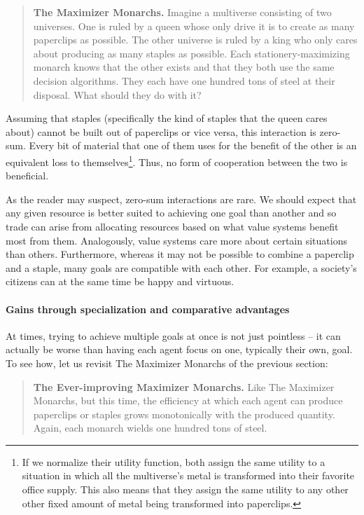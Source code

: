 \begin{quote}
\textbf{The Maximizer Monarchs.} Imagine a multiverse consisting of two
universes. One is ruled by a queen whose only drive it is to create as
many paperclips as possible. The other universe is ruled by a king who
only cares about producing as many staples as possible. Each
stationery-maximizing monarch knows that the other exists and that they
both use the same decision algorithms. They each have one hundred tons
of steel at their disposal. What should they do with it?
\end{quote}

Assuming that staples (specifically the kind of staples that the queen
cares about) cannot be built out of paperclips or vice versa, this
interaction is zero-sum. Every bit of material that one of them uses for
the benefit of the other is an equivalent loss to themselves\footnote{If
  we normalize their utility function, both assign the same utility to a
  situation in which all the multiverse's metal is transformed into
  their favorite office supply. This also means that they assign the
  same utility to any other other fixed amount of metal being
  transformed into paperclips.}. Thus, no form of cooperation between
the two is beneficial.

As the reader may suspect, zero-sum interactions are rare. We should
expect that any given resource is better suited to achieving one goal
than another and so trade can arise from allocating resources based on
what value systems benefit most from them. Analogously, value systems
care more about certain situations than others. Furthermore, whereas it
may not be possible to combine a paperclip and a staple, many goals are
compatible with each other. For example, a society's citizens can at the
same time be happy and virtuous.

\hypertarget{gains-through-specialization-and-comparative-advantages}{\paragraph{Gains
through specialization and comparative
advantages}\label{gains-through-specialization-and-comparative-advantages}}

At times, trying to achieve multiple goals at once is not just pointless
-- it can actually be worse than having each agent focus on one,
typically their own, goal. To see how, let us revisit The Maximizer
Monarchs of the previous section:

\begin{quote}
\textbf{The Ever-improving Maximizer Monarchs.} Like The Maximizer
Monarchs, but this time, the efficiency at which each agent can produce
paperclips or staples grows monotonically with the produced quantity.
Again, each monarch wields one hundred tons of steel.
\end{quote}

